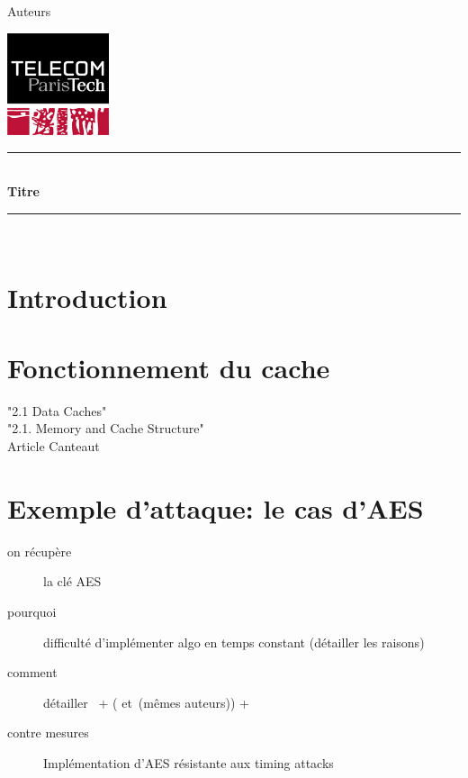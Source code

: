 \documentclass[a4paper,11pt]{article}
\newcommand{\HRule}{\rule{\linewidth}{0.5mm}}
\newcommand{\reporttitle}{Titre}
\newcommand{\reportauthor}{Auteurs}
\begin{document}
	

\begin{center}

\begin{minipage}[t]{0.4\textwidth}
  \begin{flushleft} \large
    \reportauthor
  \vfill
  \end{flushleft}
\end{minipage}
\begin{minipage}[t]{0.5\textwidth}
  \begin{flushright}
  \includegraphics [width=30mm]{figures/tpt.jpg} \\[0.5cm]
  \end{flushright}
\end{minipage}
\HRule \\[0.5cm]
{\huge \bfseries \reporttitle}\\[0.3cm]
\HRule \\[1.5cm]

\end{center}

\section*{Introduction}

\section{Fonctionnement du cache}

"2.1 Data Caches"~\cite{brumley2009cache}\\
"2.1. Memory and Cache Structure"~\cite{tromer2010efficient}\\
Article Canteaut~\cite{canteaut2006understanding}

\section{Exemple d'attaque: le cas d'AES}

\begin{description}
\item[on récupère] la clé AES
\item[pourquoi] difficulté d'implémenter algo en temps constant (détailler les raisons)
\item[comment] détailler~\cite{bernstein2005cache} + (\cite{tromer2010efficient} et~\cite{osvik2006cache}(mêmes auteurs)) + ~\cite{canteaut2006understanding}
\item[contre mesures] Implémentation d'AES résistante aux timing attacks~\cite{kasper2009faster}
\end{description}
\end{document}
